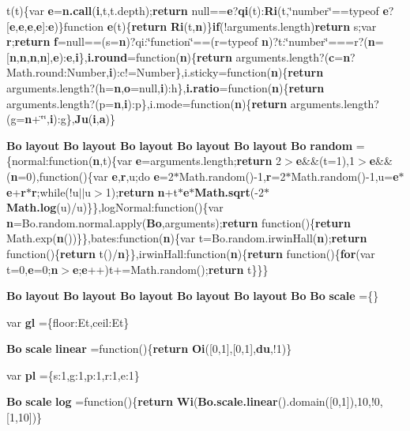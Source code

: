 \begin{DoxyCompactItemize}
t(t)\{var {\bf e}={\bf n.\+call}({\bf i},t,t.\+depth);{\bf return} null=={\bf e}?{\bf qi}(t)\+:{\bf Ri}(t,\char`\"{}number\char`\"{}==typeof {\bf e}?[{\bf e},{\bf e},{\bf e},{\bf e}]\+:{\bf e})\}function {\bf e}(t)\{{\bf return} {\bf Ri}(t,{\bf n})\}{\bf if}(!arguments.\+length){\bf return} s;var {\bf r};{\bf return} {\bf f}=null==(s={\bf n})?qi\+:\char`\"{}function\char`\"{}==(r=typeof {\bf n})?t\+:\char`\"{}number\char`\"{}===r?({\bf n}=[{\bf n},{\bf n},{\bf n},{\bf n}],{\bf e})\+:{\bf e},{\bf i}\},{\bf i.\+round}=function({\bf n})\{{\bf return} arguments.\+length?({\bf c}={\bf n}?Math.\+round\+:\+Number,{\bf i})\+:c!=Number\},i.\+sticky=function({\bf n})\{{\bf return} arguments.\+length?(h={\bf n},{\bf o}=null,{\bf i})\+:h\},{\bf i.\+ratio}=function({\bf n})\{{\bf return} arguments.\+length?(p={\bf n},{\bf i})\+:p\},i.\+mode=function({\bf n})\{{\bf return} arguments.\+length?(g={\bf n}+\char`\"{}\char`\"{},{\bf i})\+:g\},{\bf Ju}({\bf i},{\bf a})\}
\item 
{\bf Bo} {\bf layout} {\bf Bo} {\bf layout} {\bf Bo} {\bf layout} {\bf Bo} {\bf layout} {\bf Bo} {\bf layout} {\bf Bo} {\bf random} =\{normal\+:function({\bf n},t)\{var {\bf e}=arguments.\+length;{\bf return} 2$>${\bf e}\&\&(t=1),1$>${\bf e}\&\&({\bf n}=0),function()\{var {\bf e},{\bf r},u;do {\bf e}=2$\ast$Math.\+random()-\/1,{\bf r}=2$\ast$Math.\+random()-\/1,u={\bf e}$\ast${\bf e}+{\bf r}$\ast${\bf r};while(!u$\vert$$\vert$u$>$1);{\bf return} {\bf n}+t$\ast${\bf e}$\ast${\bf Math.\+sqrt}(-\/2$\ast${\bf Math.\+log}(u)/u)\}\},log\+Normal\+:function()\{var {\bf n}=Bo.\+random.\+normal.\+apply({\bf Bo},arguments);{\bf return} function()\{{\bf return} Math.\+exp({\bf n}())\}\},bates\+:function({\bf n})\{var t=Bo.\+random.\+irwin\+Hall({\bf n});{\bf return} function()\{{\bf return} t()/{\bf n}\}\},irwin\+Hall\+:function({\bf n})\{{\bf return} function()\{{\bf for}(var t=0,{\bf e}=0;{\bf n}$>${\bf e};{\bf e}++)t+=Math.\+random();{\bf return} t\}\}\}
\item 
{\bf Bo} {\bf layout} {\bf Bo} {\bf layout} {\bf Bo} {\bf layout} {\bf Bo} {\bf layout} {\bf Bo} {\bf layout} {\bf Bo} {\bf Bo} {\bf scale} =\{\}
\item 
var {\bf gl} =\{floor\+:\+Et,ceil\+:\+Et\}
\item 
{\bf Bo} {\bf scale} {\bf linear} =function()\{{\bf return} {\bf Oi}([0,1],[0,1],{\bf du},!1)\}
\item 
var {\bf pl} =\{s\+:1,g\+:1,p\+:1,r\+:1,e\+:1\}
\item 
{\bf Bo} {\bf scale} {\bf log} =function()\{{\bf return} {\bf Wi}({\bf Bo.\+scale.\+linear}().domain([0,1]),10,!0,[1,10])\}

\end{DoxyCompactItemize}
